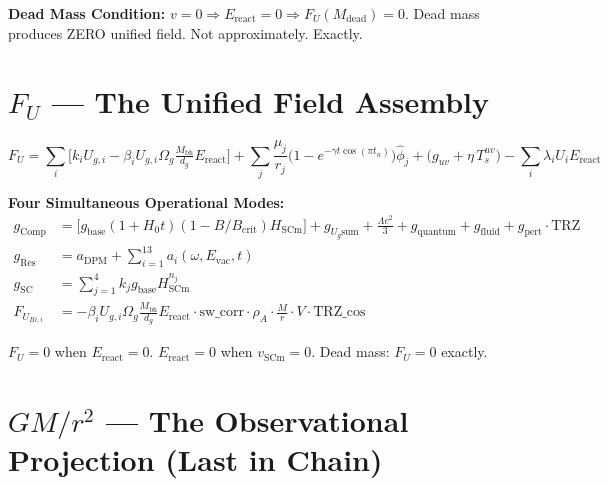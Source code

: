 \documentclass[12pt,a4paper]{article}
\begin{document}
\noindent\textbf{Dead Mass Condition:}
$v = 0 \Rightarrow E_{\text{react}} = 0 \Rightarrow F_U(M_{\text{dead}}) = 0$.
Dead mass produces ZERO unified field.  Not approximately.  Exactly.

\section{\texorpdfstring{$F_U$}{FU} --- The Unified Field Assembly}
\label{sec:fu}

\begin{equation}
  F_U = \sum_i \bigl[k_i U_{g,i} - \beta_i U_{g,i} \Omega_g \tfrac{M_{\text{bh}}}{d_g}
      E_{\text{react}}\bigr]
    + \sum_j \frac{\mu_j}{r_j}\bigl(1 - e^{-\gamma t \cos(\pi t_n)}\bigr)\hat{\phi}_j
    + \bigl(g_{uv} + \eta\, T_s^{uv}\bigr)
    - \sum_i \lambda_i U_i E_{\text{react}}
  \label{eq:fu_full}
\end{equation}

\noindent\textbf{Four Simultaneous Operational Modes:}
\begin{align}
  g_{\text{Comp}} &= \bigl[g_{\text{base}}(1{+}H_0 t)(1{-}B/B_{\text{crit}})H_{\text{SCm}}\bigr]
    + g_{U_g\text{sum}} + \tfrac{\Lambda c^2}{3} + g_{\text{quantum}}
    + g_{\text{fluid}} + g_{\text{pert}}\cdot\text{TRZ}
    \label{eq:comp_mode} \\
  g_{\text{Res}} &= a_{\text{DPM}} + \sum_{i=1}^{13} a_i(\omega, E_{\text{vac}}, t)
    \label{eq:res_mode} \\
  g_{\text{SC}} &= \sum_{j=1}^4 k_j g_{\text{base}} H_{\text{SCm}}^{n_j}
    \label{eq:sc_mode} \\
  F_{U_{Bi,i}} &= -\beta_i U_{g,i} \Omega_g \tfrac{M_{\text{bh}}}{d_g}
    E_{\text{react}}\cdot\text{sw\_corr}\cdot\rho_A\cdot\tfrac{M}{r}\cdot V\cdot\text{TRZ\_cos}
    \label{eq:buoyant_mode}
\end{align}

$F_U = 0$ when $E_{\text{react}} = 0$.  $E_{\text{react}} = 0$ when $v_{\text{SCm}} = 0$.
Dead mass: $F_U = 0$ exactly.

\section{\texorpdfstring{$GM/r^2$}{GM/r2} --- The Observational Projection (Last in Chain)}
\label{sec:newton}
\end{document}
